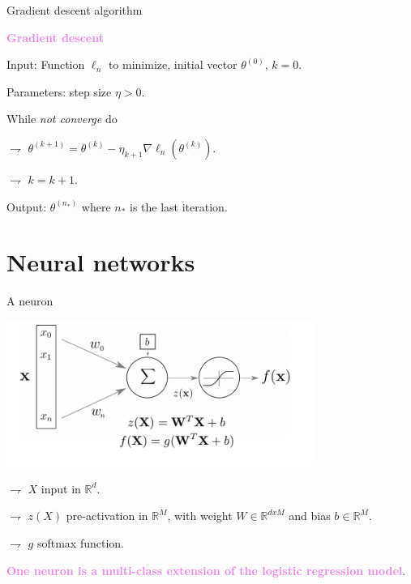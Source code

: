 \documentclass[9pt]{beamer}
\newcommand\R{\mathds{R}}
\begin{document}
\begin{frame}{Gradient descent algorithm}
	


\textbf{\textcolor{violet}{Gradient descent}}
		
\alert{Input}: Function $\ell_n$ to minimize, initial vector $\theta^{(0)}$, $k=0$.

\medskip 
	
	
\alert{Parameters}: step size $\eta>0$.

\medskip
	
While \textit{not converge} do


\hspace{2cm} $\rightharpoondown$ $\theta^{(k+1)} = \theta^{(k)} - \eta_{k+1} \nabla \ell_n(\theta^{(k)})$.

\hspace{2cm} $\rightharpoondown$ $k = k+1$.

\medskip

\alert{Output}: $\theta^{(n_*)}$ where $n_*$ is the last iteration.

	
\end{frame}



\section{Neural networks}

\begin{frame}{A neuron}

\begin{center}
\includegraphics[width = 0.75\textwidth]{neuron.png}
\end{center}

$\rightharpoondown$ $X$ \alert{input in $\R^d$}.

$\rightharpoondown$ $z(X)$ \alert{pre-activation in $\R^M$}, with \alert{weight $W\in\R^{dxM}$} and \alert{bias $b\in\R^M$}.

$\rightharpoondown$ $g$ \alert{softmax function}.

\vspace{.3cm}

{\bf\textcolor{violet}{One neuron is a multi-class extension of the logistic regression model}}. 

\end{frame}
\end{document}
